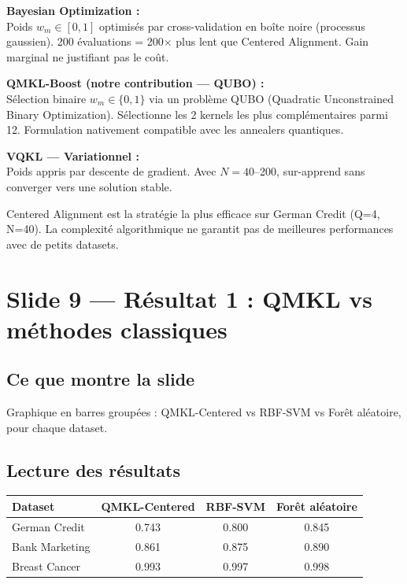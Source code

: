 \documentclass[12pt, a4paper]{article}
\begin{document}
\textbf{Bayesian Optimization :}\\
Poids $w_m \in [0,1]$ optimisés par cross-validation en boîte noire (processus gaussien).
200 évaluations = 200$\times$ plus lent que Centered Alignment.
Gain marginal ne justifiant pas le coût.

\textbf{QMKL-Boost (notre contribution — QUBO) :}\\
Sélection binaire $w_m \in \{0,1\}$ via un problème QUBO (Quadratic Unconstrained Binary Optimization).
Sélectionne les 2 kernels les plus complémentaires parmi 12.
Formulation nativement compatible avec les annealers quantiques.

\textbf{VQKL — Variationnel :}\\
Poids appris par descente de gradient.
Avec $N=40$--200, sur-apprend sans converger vers une solution stable.

\begin{retenir}
Centered Alignment est la stratégie la plus efficace sur German Credit (Q=4, N=40).
La complexité algorithmique ne garantit pas de meilleures performances
avec de petits datasets.
\end{retenir}

\section{Slide 9 — Résultat 1 : QMKL vs méthodes classiques}

\subsection*{Ce que montre la slide}

Graphique en barres groupées : QMKL-Centered vs RBF-SVM vs Forêt aléatoire, pour chaque dataset.

\subsection*{Lecture des résultats}

\begin{center}
\begin{tabular}{lccc}
  \toprule
  \textbf{Dataset} & \textbf{QMKL-Centered} & \textbf{RBF-SVM} & \textbf{Forêt aléatoire} \\
  \midrule
  German Credit  & 0.743 & 0.800 & 0.845 \\
  Bank Marketing & 0.861 & 0.875 & 0.890 \\
  Breast Cancer  & 0.993 & 0.997 & 0.998 \\
  \bottomrule
\end{tabular}
\end{center}
\end{document}
